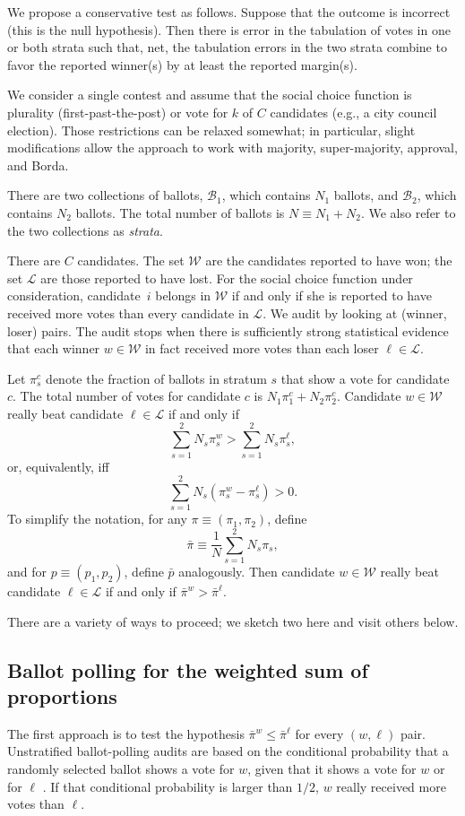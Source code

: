 \documentclass[12pt]{article}
\newcommand{\beq}{\begin{equation}}
\newcommand{\eeq}{\end{equation}}
\newcommand{\mc}[1]{\ensuremath{\mathcal{#1}}}
\newcommand{\bpi}{\bar{\pi}}
\newcommand{\bp}{\bar{p}}
\begin{document}






We propose a conservative test as follows. 
Suppose that the outcome is incorrect (this is the null hypothesis).
Then there is error in the tabulation of votes in one or both strata such that, net,
the tabulation errors in the two strata combine to favor the reported winner(s)
by at least the reported margin(s).

We consider a single contest and assume that the
social choice function is plurality (first-past-the-post)
or vote for $k$ of $C$ candidates (e.g., a city council election).
Those restrictions can be relaxed somewhat; in particular, slight modifications allow
the approach to work with majority, super-majority, approval, and Borda.

There are two collections of ballots, $\mc{B}_1$, which contains $N_1$ ballots, 
and $\mc{B}_2$, which contains $N_2$ ballots.
The total number of ballots is $N \equiv N_1 + N_2$.
We also refer to the two collections as \emph{strata}.

There are $C$ candidates.
The set $\mc{W}$ are the candidates reported to have won; the set $\mc{L}$ are those
reported to have lost.
For the social choice function under consideration, candidate~$i$ belongs in $\mc{W}$ if and
only if she is reported to have received more votes than every candidate in $\mc{L}$.
We audit by looking at (winner, loser) pairs.
The audit stops when there is sufficiently strong statistical evidence that each winner 
$w \in \mc{W}$ in fact received more votes
than each loser $\ell \in \mc{L}$.

Let $\pi_s^c$ denote the fraction of ballots in stratum $s$ that show a vote for candidate $c$.
The total number of votes for candidate $c$ is $N_1 \pi_1^c + N_2 \pi_2^c$.
Candidate $w \in \mc{W}$ really beat candidate $\ell \in \mc{L}$ if and only if
\beq
    \sum_{s=1}^2 N_s \pi_s^w > \sum_{s=1}^2 N_s \pi_s^\ell,
\eeq
or, equivalently, iff
\beq
    \sum_{s=1}^2 N_s (\pi_s^w-\pi_s^\ell) > 0.
\eeq
To simplify the notation, for any $\pi \equiv (\pi_1, \pi_2)$, define 
\beq
    \bpi \equiv \frac{1}{N}\sum_{s=1}^2 N_s \pi_s,
\eeq
and for $p \equiv (p_1, p_2)$, define $\bp$ analogously.
Then candidate $w \in \mc{W}$ really beat candidate $\ell \in \mc{L}$ if and only if
$\bpi^w > \bpi^\ell$.

There are a variety of ways to proceed; we sketch two here and visit others below.


\subsection{Ballot polling for the weighted sum of proportions}
The first approach is to test the hypothesis 
$\bpi^w \le \bpi^\ell$ for every $(w, \ell)$ pair.
Unstratified ballot-polling audits are based on the conditional 
probability that a randomly selected
ballot shows a vote for $w$, given that it shows a vote for $w$ or for $\ell$
\citep{lindemanStark12,lindemanEtal12}.
If that conditional probability is larger than $1/2$, $w$ really received more votes than
$\ell$.
\end{document}
